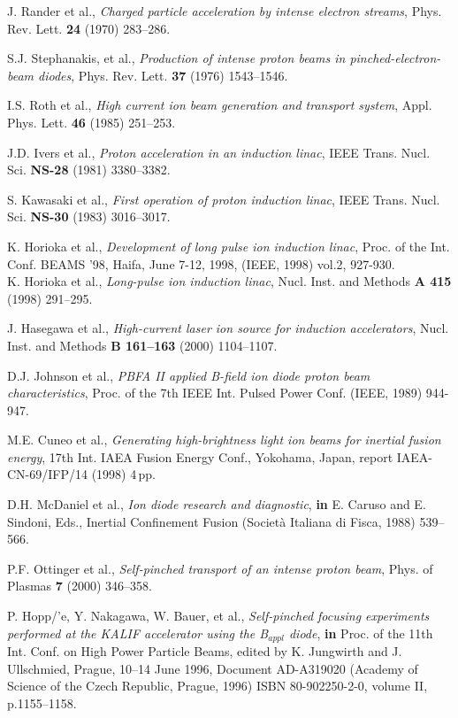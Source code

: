 \documentclass [12pt,a4paper,     ]{report} %
\begin{document}
\begin{enumerate}
  J. Rander et al., \emph{Charged particle acceleration by intense electron streams}, Phys. Rev. Lett. {\bf 24} (1970) 283--286. 

 S.J. Stephanakis, et al., \emph{Production of intense proton beams in pinched-electron-beam diodes}, Phys. Rev. Lett. {\bf 37} (1976) 1543--1546.

 I.S. Roth et al., \emph{High current ion beam generation and transport system}, Appl. Phys. Lett. {\bf 46} (1985) 251--253.

 J.D. Ivers et al., \emph{Proton acceleration in an induction linac}, IEEE Trans. Nucl. Sci. {\bf NS-28} (1981) 3380--3382.

 S. Kawasaki et al., \emph{First operation of proton induction linac}, IEEE Trans. Nucl. Sci. {\bf NS-30} (1983) 3016--3017.

 K. Horioka et al., \emph{Development of long pulse ion induction linac},  Proc. of the Int. Conf. BEAMS '98, Haifa, June 7-12, 1998, (IEEE, 1998) vol.2, 927-930.\\  K. Horioka et al., \emph{Long-pulse ion induction linac}, Nucl. Inst. and Methods {\bf A 415} (1998) 291--295.

 J. Hasegawa et al., \emph{High-current laser ion source for induction accelerators}, Nucl. Inst. and Methods {\bf B 161--163} (2000) 1104--1107.

 D.J. Johnson et al., \emph{PBFA II applied B-field ion diode proton beam characteristics}, Proc. of the 7th IEEE Int. Pulsed Power Conf. (IEEE, 1989) 944-947.

 M.E. Cuneo et al., \emph{Generating high-brightness light ion beams for inertial fusion energy}, 17th Int. IAEA Fusion Energy Conf., Yokohama, Japan, report IAEA-CN-69/IFP/14 (1998) 4\,pp.

 D.H. McDaniel et al., \emph{Ion diode research and diagnostic}, {\bf in} E. Caruso and E. Sindoni, Eds., Inertial Confinement Fusion (Societ\`a Italiana di Fisca, 1988) 539--566.

 P.F. Ottinger et al., \emph{Self-pinched transport of an intense proton beam}, Phys. of Plasmas {\bf 7} (2000) 346--358.

 P. Hopp/'e, Y. Nakagawa, W. Bauer, et al., \emph{Self-pinched focusing experiments performed at the KALIF accelerator using the B$_{appl}$ diode}, {\bf in} Proc. of the 11th Int. Conf. on High Power Particle Beams, edited by K. Jungwirth and J. Ullschmied, Prague, 10--14 June 1996, Document AD-A319020 (Academy of Science of the Czech Republic, Prague, 1996) ISBN 80-902250-2-0, volume II, p.1155--1158.


\end{enumerate}
\end{document}
